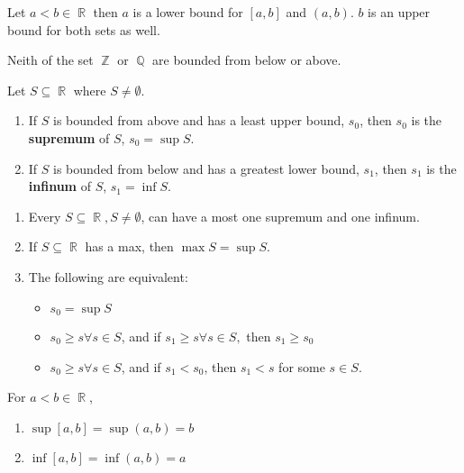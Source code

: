 \documentclass[a4paper, 11pt]{article}
\DeclareMathOperator{\R}{\mathbb{R}}
\DeclareMathOperator{\Q}{\mathbb{Q}}
\DeclareMathOperator*{\Z}{\mathbb{Z}}
\begin{document}
\begin{example}
Let $a < b \in \R$ then $a$ is a lower bound for $[a, b]$ and $(a, b)$. $b$ is an upper bound for
both sets as well.
\end{example}

\begin{example}
Neith of the set $\Z$ or $\Q$ are bounded from below or above.
\end{example}

\begin{definition}
Let $S \subseteq \R$ where $S \neq \emptyset$.
\begin{enumerate}
  \item If $S$ is bounded from above and has a least upper bound, $s_0$, then $s_0$ is the
  \textbf{supremum} of $S$, $s_0=\sup S$.
  \item If $S$ is bounded from below and has a greatest lower bound, $s_1$, then $s_1$ is the
  \textbf{infinum} of $S$, $s_1=\inf S$.
\end{enumerate}

\begin{remark}
  \begin{enumerate}
    \item Every $S \subseteq \R, S\neq \emptyset$, can have a most one supremum and one infinum.
    \item If $S \subseteq \R$ has a max, then $\max S = \sup S$.
    \item The following are equivalent:
    \begin{itemize}
      \item $s_0 = \sup S$
      \item $s_0 \geq s \forall s \in S$, and if $s_1 \geq s \forall s \in S,$ then $s_1 \geq s_0$
      \item $s_0 \geq s \forall s \in S$, and if $s_1 < s_0$, then $s_1 < s$ for some $s \in S$.
    \end{itemize}
  \end{enumerate}
\end{remark}
\end{definition}

\begin{example}
For $a < b \in \R$,
\begin{enumerate}
  \item $\sup[a, b] = \sup(a, b) = b$
  \item $\inf[a, b] = \inf(a, b) = a$
\end{enumerate}
\end{example}
\end{document}

